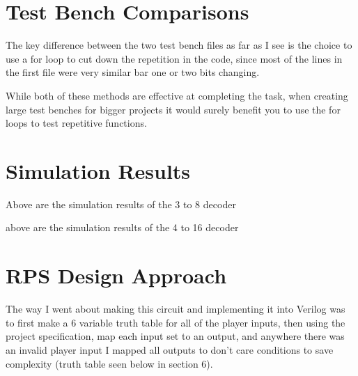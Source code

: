 \documentclass{article}
\begin{document}
\section{Test Bench Comparisons}
The key difference between the two test bench files as far as I see is the choice to use a for loop to cut down the repetition in the code, since most of the lines in the first file were very similar bar one or two bits changing.

While both of these methods are effective at completing the task, when creating large test benches for bigger projects it would surely benefit you to use the for loops to test repetitive functions.
\section{Simulation Results}
\begin{center}
    
    Above are the simulation results of the 3 to 8 decoder
\end{center}

\begin{center}
    
    above are the simulation results of the 4 to 16 decoder
\end{center}
\section{RPS Design Approach}
The way I went about making this circuit and implementing it into Verilog was to first make a 6 variable truth table for all of the player inputs, then using the project specification, map each input set to an output, and anywhere there was an invalid player input I mapped all outputs to don't care conditions to save complexity (truth table seen below in section 6).
\end{document}
